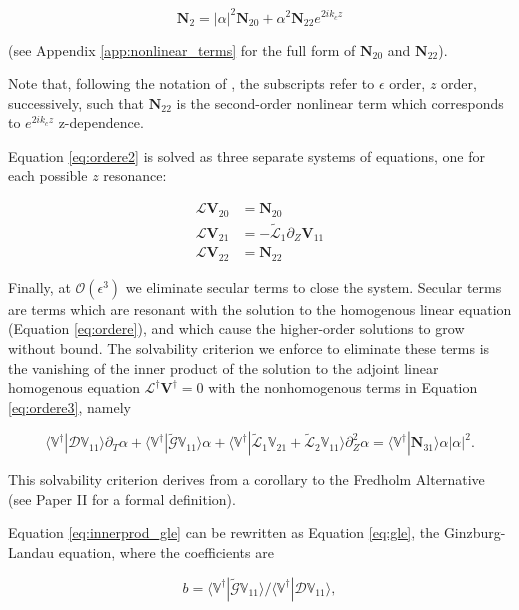 \documentclass{emulateapj}
\newcommand{\beq}{\begin{equation}}
\newcommand{\eeq}{\end{equation}}
\begin{document}
\beq
\mathbf{N}_2 = |\alpha|^2 \mathbf{N}_{20} + \alpha^2 \mathbf{N}_{22} e^{2 i k_c z}
\eeq

(see Appendix \ref{app:nonlinear_terms} for the full form of $\mathbf{N}_{20}$ and $\mathbf{N}_{22}$). 

Note that, following the notation of \citet{Umurhan:2007hs}, the subscripts refer to $\epsilon$ order, $z$ order, successively, such that $\mathbf{N}_{22}$ is the second-order nonlinear term which corresponds to $e^{2 i k_c z}$ z-dependence.  

Equation \ref{eq:ordere2} is solved as three separate systems of equations, one for each possible $z$ resonance: 

\begin{align}
\mathcal{L}\mathbf{V}_{20} & = \mathbf{N}_{20}\\
\mathcal{L}\mathbf{V}_{21} & = - \widetilde{\mathcal{L}}_1 \partial_Z \mathbf{V}_{11} \\
\mathcal{L}\mathbf{V}_{22} & = \mathbf{N}_{22}
\end{align}

Finally, at $\mathcal{O}(\epsilon^3)$ we eliminate secular terms to close the system. Secular terms are terms which are resonant with the solution to the homogenous linear equation (Equation \ref{eq:ordere}), and which cause the higher-order solutions to grow without bound. The solvability criterion we enforce to eliminate these terms is the vanishing of the inner product of the solution to the adjoint linear homogenous equation $\mathcal{L}^\dagger \mathbf{V}^\dagger = 0$ with the nonhomogenous terms in Equation \ref{eq:ordere3}, namely

\beq\label{eq:innerprod_gle}
\langle \mathbb{V}^\dagger | \mathcal{D} \mathbb{V}_{11} \rangle \partial_T \alpha + \langle  \mathbb{V}^\dagger | \widetilde{\mathcal{G}} \mathbb{V}_{11} \rangle \alpha +  \langle \mathbb{V}^\dagger | \widetilde{\mathcal{L}}_1 \mathbb{V}_{21} + \widetilde{\mathcal{L}}_2 \mathbb{V}_{11} \rangle \partial_Z^2 \alpha = \langle \mathbb{V}^\dagger | \mathbf{N}_{31} \rangle \alpha |\alpha|^2.
\eeq

This solvability criterion derives from a corollary to the Fredholm Alternative (see Paper II for a formal definition). 

Equation \ref{eq:innerprod_gle} can be rewritten as Equation \ref{eq:gle}, the Ginzburg-Landau equation, where the coefficients are 

\beq
b = \langle  \mathbb{V}^\dagger | \widetilde{\mathcal{G}} \mathbb{V}_{11} \rangle / \langle \mathbb{V}^\dagger | \mathcal{D} \mathbb{V}_{11} \rangle,
\eeq
\end{document}
